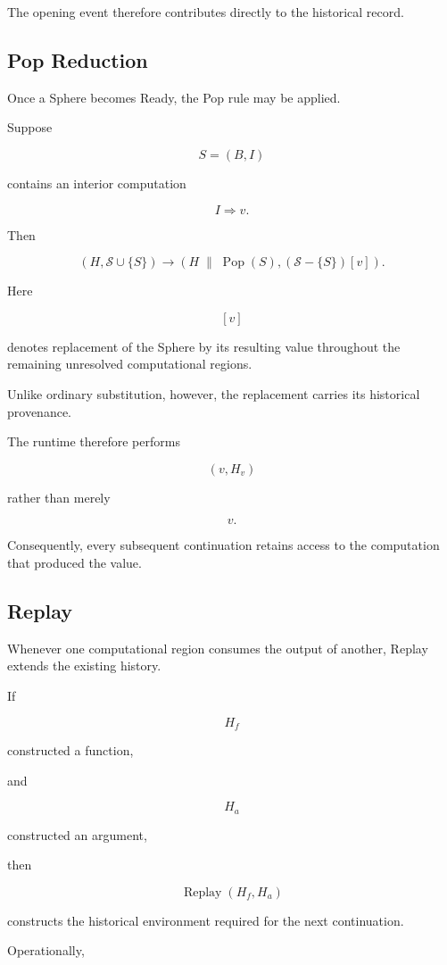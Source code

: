 \documentclass[12pt,oneside]{article}
\theoremstyle{definition}
\theoremstyle{remark}
\begin{document}
The opening event therefore contributes directly to the historical record.

\subsection{Pop Reduction}

Once a Sphere becomes Ready, the Pop rule may be applied.

Suppose

\[
S=(B,I)
\]

contains an interior computation

\[
I
\Longrightarrow
v.
\]

Then

\[
(H,\mathcal{S}\cup\{S\})
\longrightarrow
(H\;\|\;\operatorname{Pop}(S),
(\mathcal{S}-\{S\})[v]).
\]

Here

\[
[v]
\]

denotes replacement of the Sphere by its resulting value throughout the
remaining unresolved computational regions.

Unlike ordinary substitution, however, the replacement carries its historical
provenance.

The runtime therefore performs

\[
(v,H_v)
\]

rather than merely

\[
v.
\]

Consequently, every subsequent continuation retains access to the computation
that produced the value.

\subsection{Replay}

Whenever one computational region consumes the output of another, Replay
extends the existing history.

If

\[
H_f
\]

constructed a function,

and

\[
H_a
\]

constructed an argument,

then

\[
\operatorname{Replay}(H_f,H_a)
\]

constructs the historical environment required for the next continuation.

Operationally,
\end{document}
